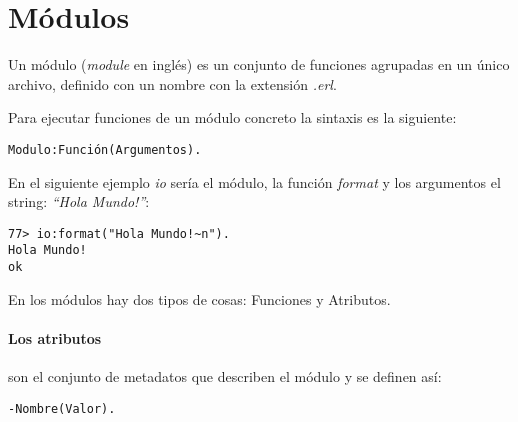 
\section{Módulos}

Un módulo (\textit{module} en inglés) es un conjunto de funciones agrupadas en un único archivo, definido con
un nombre con la extensión \textit{.erl}.

Para ejecutar funciones de un módulo concreto la sintaxis es la siguiente:

\begin{verbatim}
Modulo:Función(Argumentos).
\end{verbatim}

En el siguiente ejemplo \textit{io} sería el módulo, la función \textit{format} y los argumentos el string:
\textit{``Hola Mundo!''}:
\begin{lstlisting}
77> io:format("Hola Mundo!~n").
Hola Mundo!
ok
\end{lstlisting}

En los módulos hay dos tipos de cosas: Funciones y Atributos.

\paragraph{Los atributos} son el conjunto de metadatos que describen el módulo y se definen así:
\begin{verbatim}
-Nombre(Valor).
\end{verbatim}

